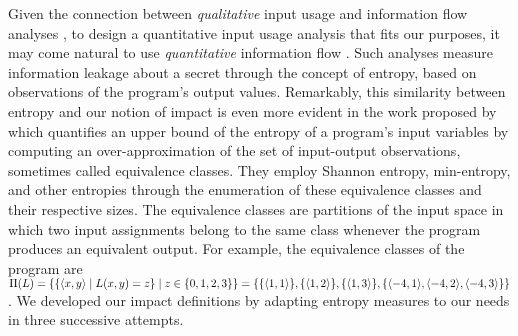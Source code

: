 Given the connection between \emph{qualitative} input usage and information flow analyses , to design a quantitative input usage analysis that fits our purposes, it may come natural to use \emph{quantitative} information flow .
Such analyses measure information leakage about a secret through the concept of entropy, based on observations of the program's output values.
%
Remarkably, this similarity between entropy and our notion of impact is even more evident
in the work proposed by  which quantifies an upper bound of the entropy of a program's input variables by computing an over-approximation of the set of input-output observations, sometimes called equivalence classes. They employ Shannon entropy, min-entropy, and other entropies through the enumeration of these equivalence classes and their respective sizes. The equivalence classes are partitions of the input space in which two input assignments belong to the same class whenever the program produces an equivalent output.
For example, the equivalence classes of the program \landingprogram{} are $\entropypartitions[\landingprogram]=\setdef{\setdef{\tuple{x}{y}}{\landingprogram(x, y)=\defoutput}}{\defoutput\in\{0, 1, 2, 3\}}
=\{\{\tuple{1}{1}\}, \{\tuple{1}{2}\}, \{\tuple{1}{3}\}, \{\tuple{-4}{1}, \tuple{-4}{2}, \tuple{-4}{3}\}\}$.
We developed our impact definitions by adapting entropy measures to our needs in three successive attempts.


